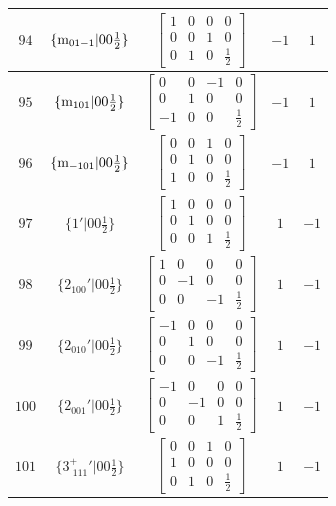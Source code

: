 \documentclass[fleqn,8pt]{jsarticle}
\begin{document}
\begin{longtable}{ccccc}
$ 94 $ & $ \{{\rm m}_{01-1}|0 0 \frac{1}{2}\} $ & $ \begin{bmatrix} 1 & 0 & 0 & 0 \\ 0 & 0 & 1 & 0 \\ 0 & 1 & 0 & \frac{1}{2} \end{bmatrix} $ & $ -1 $ & $ 1 $ \\ \hline
$ 95 $ & $ \{{\rm m}_{101}|0 0 \frac{1}{2}\} $ & $ \begin{bmatrix} 0 & 0 & -1 & 0 \\ 0 & 1 & 0 & 0 \\ -1 & 0 & 0 & \frac{1}{2} \end{bmatrix} $ & $ -1 $ & $ 1 $ \\ \hline
$ 96 $ & $ \{{\rm m}_{-101}|0 0 \frac{1}{2}\} $ & $ \begin{bmatrix} 0 & 0 & 1 & 0 \\ 0 & 1 & 0 & 0 \\ 1 & 0 & 0 & \frac{1}{2} \end{bmatrix} $ & $ -1 $ & $ 1 $ \\ \hline
$ 97 $ & $ \{1{}'|0 0 \frac{1}{2}\} $ & $ \begin{bmatrix} 1 & 0 & 0 & 0 \\ 0 & 1 & 0 & 0 \\ 0 & 0 & 1 & \frac{1}{2} \end{bmatrix} $ & $ 1 $ & $ -1 $ \\ \hline
$ 98 $ & $ \{2{}_{100}{}'|0 0 \frac{1}{2}\} $ & $ \begin{bmatrix} 1 & 0 & 0 & 0 \\ 0 & -1 & 0 & 0 \\ 0 & 0 & -1 & \frac{1}{2} \end{bmatrix} $ & $ 1 $ & $ -1 $ \\ \hline
$ 99 $ & $ \{2{}_{010}{}'|0 0 \frac{1}{2}\} $ & $ \begin{bmatrix} -1 & 0 & 0 & 0 \\ 0 & 1 & 0 & 0 \\ 0 & 0 & -1 & \frac{1}{2} \end{bmatrix} $ & $ 1 $ & $ -1 $ \\ \hline
$ 100 $ & $ \{2{}_{001}{}'|0 0 \frac{1}{2}\} $ & $ \begin{bmatrix} -1 & 0 & 0 & 0 \\ 0 & -1 & 0 & 0 \\ 0 & 0 & 1 & \frac{1}{2} \end{bmatrix} $ & $ 1 $ & $ -1 $ \\ \hline
$ 101 $ & $ \{3^{+}_{\,\,111}{}'|0 0 \frac{1}{2}\} $ & $ \begin{bmatrix} 0 & 0 & 1 & 0 \\ 1 & 0 & 0 & 0 \\ 0 & 1 & 0 & \frac{1}{2} \end{bmatrix} $ & $ 1 $ & $ -1 $ \\ \hline

\end{longtable}
\end{document}
